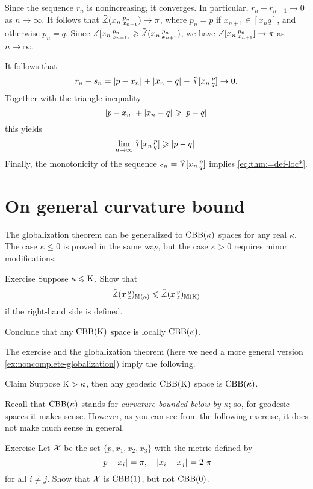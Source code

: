 Since the sequence $r_n$ is nonincreasing, it converges.
In particular, $r_n-r_{n+1}\to 0$ as $n\to\infty$.
It follows that $\tilde\measuredangle(x_n\,{}^{p_n}_{x_{n+1}})\to \pi$,
where $p_n=p$ if $x_{n+1}\in [x_nq]$, and otherwise $p_n=q$.
Since $\measuredangle[x_n\,{}^{p_n}_{x_{n+1}}]\geqslant\tilde\measuredangle(x_n\,{}^{p_n}_{x_{n+1}})$, we have
$\measuredangle[x_n\,{}^{p_n}_{x_{n+1}}]\to \pi$  as $n\to\infty$.

It follows that
\[r_n-s_n=\dist{p}{x_n}{}+\dist{x_n}{q}{}-\side \hinge{x_n}p q\to 0.\] 
Together with the triangle inequality
\[
\dist{p}{x_n}{}+\dist{x_n}{q}{}\ge\dist{p}{q}{}
\]
this yields
\[\lim_{n\to\infty}\side \hinge{x_n}p q\ge \dist{p}{q}{}.\]
Finally, the monotonicity of the sequence $s_n=\mathop{\tilde\curlyvee}\nolimits [x_n\,{}^{p}_{q}]$ implies \ref{eq:thm:=def-loc*}.
\qeds

\section{On general curvature bound}

The globalization theorem  can be generalized to $\mathrm{CBB}(\kappa)$ spaces for any real $\kappa$.
The case $\kappa\le 0$ is proved in the same way, but the case $\kappa>0$ requires minor modifications.

\begin{thm}{Exercise}\label{ex:mono-mod-angle}
Suppose $\kappa\leqslant \mathrm{K}$.
Show that 
\[\tilde\measuredangle(x\,{}^{y}_{z})_{\mathbb{M}(\kappa)}\leqslant \tilde\measuredangle(x\,{}^{y}_{z})_{\mathbb{M}(\mathrm{K})}\]
if the right-hand side is defined.

Conclude that any $\mathrm{CBB}(\mathrm{K})$ space is locally $\mathrm{CBB}(\kappa)$.
\end{thm}

The exercise and the globalization theorem (here we need a more general version \ref{ex:noncomplete-globalization}) imply the following.

\begin{thm}{Claim}\label{clm:K>k}
Suppose $\mathrm{K}>\kappa$, then any geodesic $\mathrm{CBB}(\mathrm{K})$ space is  $\mathrm{CBB}(\kappa)$.
\end{thm}

Recall that $\mathrm{CBB}(\kappa)$ stands for \textit{curvature bounded below by $\kappa$}; so, for geodesic spaces it makes sense.
However, as you can see from the following exercise, it does not make much sense in general.

\begin{thm}{Exercise}\label{ex:CBB(1)notitCBB(0)}
Let $\mathcal{X}$ be the set $\{p,x_1,x_2,x_3\}$ with the metric defined by
\[\dist{p}{x_i}{}=\pi,\quad\dist{x_i}{x_j}{}=2\cdot\pi\]
for all $i\ne j$.
Show that $\mathcal{X}$ is $\mathrm{CBB}(1)$, but not $\mathrm{CBB}(0)$.
\end{thm}

